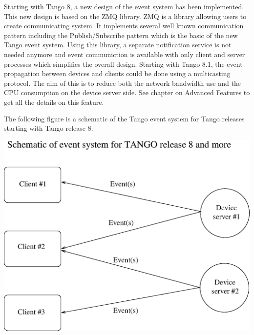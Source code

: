 Starting with Tango 8, a new design of the event system has been implemented.
This new design is based on the ZMQ library. ZMQ is a
library allowing users to create communicating system. It implements
several well known communication pattern including the Publish/Subscribe
pattern which is the basic of the new Tango event system. Using this
library, a separate notification service is not needed anymore and
event communiction is available with only client and server processes
which simplifies the overall design. Starting with Tango 8.1, the
event propagation between devices and clients could be done using
a multicasting protocol. The aim of this is to
reduce both the network bandwidth use and the CPU consumption on the
device server side. See chapter on Advanced Features to get all the
details on this feature.

The following figure is a schematic of the Tango event system for
Tango releases starting with Tango release 8.

\vspace{0.3cm}


\begin{center}
\includegraphics[bb=0bp 0bp 523bp 485bp,clip,scale=0.8]{ds_model/event_schematic_zmq}
\par\end{center}

\vspace{0.3cm}


